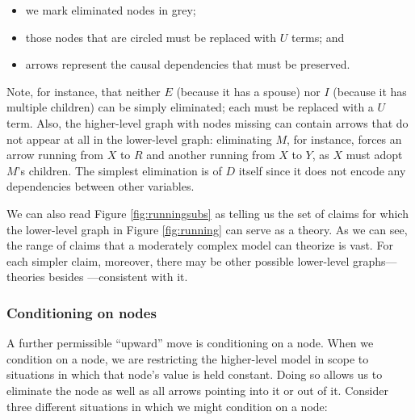 \documentclass[
  12pt,
]{book}
\providecommand{\tightlist}{%
  \setlength{\itemsep}{0pt}\setlength{\parskip}{0pt}}
\begin{document}
\begin{itemize}
\tightlist
\item
  we mark eliminated nodes in grey;
\item
  those nodes that are circled must be replaced with \(U\) terms; and
\item
  arrows represent the causal dependencies that must be preserved.
\end{itemize}

Note, for instance, that neither \(E\) (because it has a spouse) nor \(I\) (because it has multiple children) can be simply eliminated; each must be replaced with a \(U\) term. Also, the higher-level graph with nodes missing can contain arrows that do not appear at all in the lower-level graph: eliminating \(M\), for instance, forces an arrow running from \(X\) to \(R\) and another running from \(X\) to \(Y\), as \(X\) must adopt \(M\)'s children. The simplest elimination is of \(D\) itself since it does not encode any dependencies between other variables.

We can also read Figure \ref{fig:runningsubs} as telling us the set of claims for which the lower-level graph in Figure \ref{fig:running} can serve as a theory. As we can see, the range of claims that a moderately complex model can theorize is vast. For each simpler claim, moreover, there may be other possible lower-level graphs---theories besides ---consistent with it.

\hypertarget{conditioning-on-nodes}{%
\subsubsection{Conditioning on nodes}\label{conditioning-on-nodes}}

A further permissible ``upward'' move is conditioning on a node. When we condition on a node, we are restricting the higher-level model in scope to situations in which that node's value is held constant. Doing so allows us to eliminate the node as well as all arrows pointing into it or out of it. Consider three different situations in which we might condition on a node:
\end{document}
